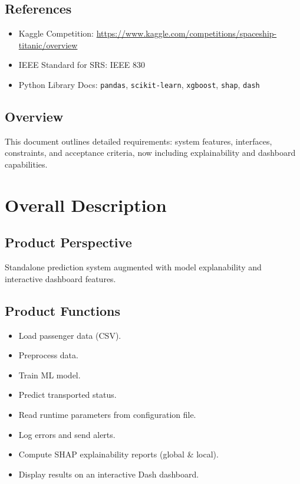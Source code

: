 \documentclass[15pt]{article}
\begin{document}
\subsection{References}
\begin{itemize}
  \item Kaggle Competition: \url{https://www.kaggle.com/competitions/spaceship-titanic/overview}
  \item IEEE Standard for SRS: IEEE 830
  \item Python Library Docs: \texttt{pandas}, \texttt{scikit-learn}, \texttt{xgboost}, \texttt{shap}, \texttt{dash}
\end{itemize}

\subsection{Overview}
This document outlines detailed requirements: system features, interfaces, constraints, and acceptance criteria, now including explainability and dashboard capabilities.

\section{Overall Description}
\subsection{Product Perspective}
Standalone prediction system augmented with model explanability and interactive dashboard features.

\subsection{Product Functions}
\begin{itemize}
  \item Load passenger data (CSV).
  \item Preprocess data.
  \item Train ML model.
  \item Predict transported status.
  \item Read runtime parameters from configuration file.
  \item Log errors and send alerts.
  \item Compute SHAP explainability reports (global & local).
  \item Display results on an interactive Dash dashboard.
\end{itemize}
\end{document}
